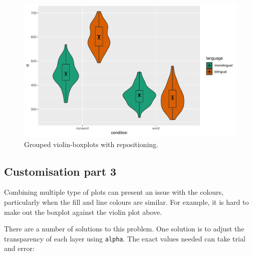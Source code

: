 \documentclass[
  english,
  doc,floatsintext]{apa6}
\begin{document}
\begin{figure}

{\centering \includegraphics[width=1\linewidth]{images/viobox3-1} 

}

\caption{Grouped violin-boxplots with repositioning.}\label{fig:viobox3}
\end{figure}

\hypertarget{customisation-part-3}{%
\subsection{Customisation part 3}\label{customisation-part-3}}

Combining multiple type of plots can present an issue with the colours, particularly when the fill and line colours are similar. For example, it is hard to make out the boxplot against the violin plot above.

There are a number of solutions to this problem. One solution is to adjust the transparency of each layer using \texttt{alpha}. The exact values needed can take trial and error:
\end{document}
